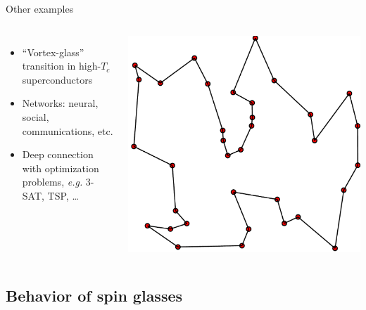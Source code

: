 \documentclass{beamer}
\begin{document}
\begin{frame}{Other examples}
  \begin{columns}
    \begin{itemize}
      \item ``Vortex-glass'' transition in high-$T_c$ superconductors
      \item Networks: neural, social, communications, etc.
      \item Deep connection with optimization problems,
        \textit{e.g.} 3-SAT, TSP, \dots
    \end{itemize}
    \includegraphics[width=\columnwidth]{TSP}
  \end{columns}
\end{frame}


\subsection{Behavior of spin glasses}
\end{document}
